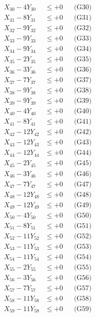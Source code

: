 \documentclass[a4paper,10pt]{article}
\begin{document}
{\begin{align}
\allowbreak
X_{30} - 4Y_{30} &\leq +0 && \text{(G30)} \\
X_{31} - 8Y_{31} &\leq +0 && \text{(G31)} \\
X_{32} - 9Y_{32} &\leq +0 && \text{(G32)} \\
X_{33} - 9Y_{33} &\leq +0 && \text{(G33)} \\
X_{34} - 9Y_{34} &\leq +0 && \text{(G34)} \\
X_{35} - 2Y_{35} &\leq +0 && \text{(G35)} \\
X_{36} - 3Y_{36} &\leq +0 && \text{(G36)} \\
X_{37} - 7Y_{37} &\leq +0 && \text{(G37)} \\
X_{38} - 9Y_{38} &\leq +0 && \text{(G38)} \\
X_{39} - 9Y_{39} &\leq +0 && \text{(G39)} \\
\allowbreak
X_{40} - 4Y_{40} &\leq +0 && \text{(G40)} \\
X_{41} - 8Y_{41} &\leq +0 && \text{(G41)} \\
X_{42} - 12Y_{42} &\leq +0 && \text{(G42)} \\
X_{43} - 12Y_{43} &\leq +0 && \text{(G43)} \\
X_{44} - 12Y_{44} &\leq +0 && \text{(G44)} \\
X_{45} - 2Y_{45} &\leq +0 && \text{(G45)} \\
X_{46} - 3Y_{46} &\leq +0 && \text{(G46)} \\
X_{47} - 7Y_{47} &\leq +0 && \text{(G47)} \\
X_{48} - 12Y_{48} &\leq +0 && \text{(G48)} \\
X_{49} - 12Y_{49} &\leq +0 && \text{(G49)} \\
\allowbreak
X_{50} - 4Y_{50} &\leq +0 && \text{(G50)} \\
X_{51} - 8Y_{51} &\leq +0 && \text{(G51)} \\
X_{52} - 11Y_{52} &\leq +0 && \text{(G52)} \\
X_{53} - 11Y_{53} &\leq +0 && \text{(G53)} \\
X_{54} - 11Y_{54} &\leq +0 && \text{(G54)} \\
X_{55} - 2Y_{55} &\leq +0 && \text{(G55)} \\
X_{56} - 3Y_{56} &\leq +0 && \text{(G56)} \\
X_{57} - 7Y_{57} &\leq +0 && \text{(G57)} \\
X_{58} - 11Y_{58} &\leq +0 && \text{(G58)} \\
X_{59} - 11Y_{59} &\leq +0 && \text{(G59)} \\
\allowbreak

\end{align}}
\end{document}
